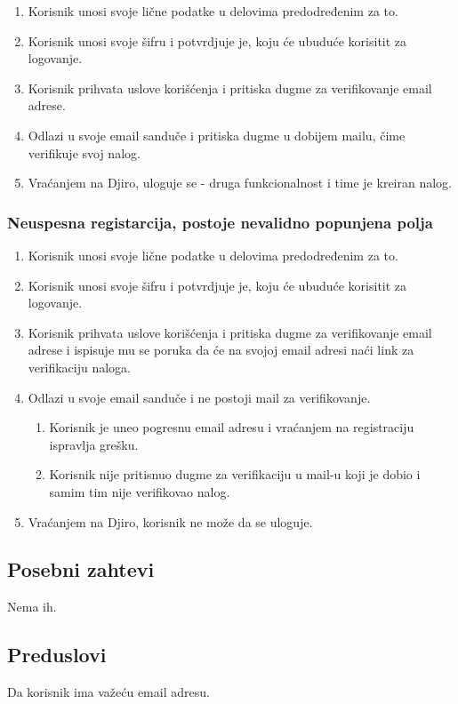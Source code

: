 \documentclass[12pt]{article}
\begin{document}
\begin{enumerate}
   \item Korisnik unosi svoje lične podatke u delovima predodređenim za to.
   \item Korisnik unosi svoje šifru i potvrdjuje je, koju će ubuduće korisitit za logovanje.
   \item Korisnik prihvata uslove korišćenja i pritiska dugme za verifikovanje email adrese.
   \item  Odlazi u svoje email sanduče i pritiska dugme u dobijem mailu, čime verifikuje svoj nalog.
   \item Vraćanjem na Djiro, uloguje se - druga funkcionalnost i time je kreiran nalog.
 \end{enumerate}
 
 \subsubsection{Neuspesna registarcija, postoje nevalidno popunjena polja}

\begin{enumerate}
   \item Korisnik unosi svoje lične podatke u delovima predodređenim za to.
   \item Korisnik unosi svoje šifru i potvrdjuje je, koju će ubuduće korisitit za logovanje.
   \item Korisnik prihvata uslove korišćenja i pritiska dugme za verifikovanje email adrese i ispisuje mu se poruka da će na svojoj email adresi naći link za verifikaciju naloga.
   \item  Odlazi u svoje email sanduče i ne postoji mail za verifikovanje.
   \begin{enumerate}
   \item Korisnik je uneo pogresnu email adresu i vraćanjem na registraciju ispravlja grešku.
   \item Korisnik nije pritisnuo dugme za verifikaciju u mail-u koji je dobio i samim tim nije verifikovao nalog.
   \end{enumerate}
   \item Vraćanjem na Djiro, korisnik ne može da se uloguje.
 \end{enumerate}

\subsection{Posebni zahtevi}
Nema ih.
\subsection{Preduslovi}
Da korisnik ima važeću email adresu.
\end{document}

